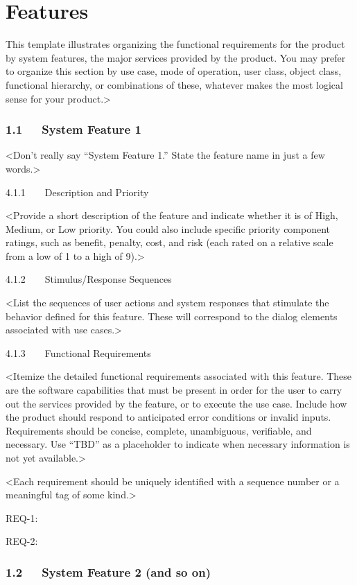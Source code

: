 \documentclass{scrreprt}
\begin{document}
    \chapter{Features} 
    This template illustrates organizing the functional requirements for the product by system features, the major services provided by the product. You may prefer to organize this section by use case, mode of operation, user class, object class, functional hierarchy, or combinations of these, whatever makes the most logical sense for your product.>

\subsection*{1.1   System Feature 1}

<Don’t really say “System Feature 1.” State the feature name in just a few words.>

4.1.1    Description and Priority

<Provide a short description of the feature and indicate whether it is of High, Medium, or Low priority. You could also include specific priority component ratings, such as benefit, penalty, cost, and risk (each rated on a relative scale from a low of 1 to a high of 9).>

4.1.2    Stimulus/Response Sequences

<List the sequences of user actions and system responses that stimulate the behavior defined for this feature. These will correspond to the dialog elements associated with use cases.>

4.1.3    Functional Requirements

<Itemize the detailed functional requirements associated with this feature. These are the software capabilities that must be present in order for the user to carry out the services provided by the feature, or to execute the use case. Include how the product should respond to anticipated error conditions or invalid inputs. Requirements should be concise, complete, unambiguous, verifiable, and necessary. Use “TBD” as a placeholder to indicate when necessary information is not yet available.>

<Each requirement should be uniquely identified with a sequence number or a meaningful tag of some kind.>

REQ-1:

REQ-2:

\subsection*{1.2   System Feature 2 (and so on)}
      
\end{document}
